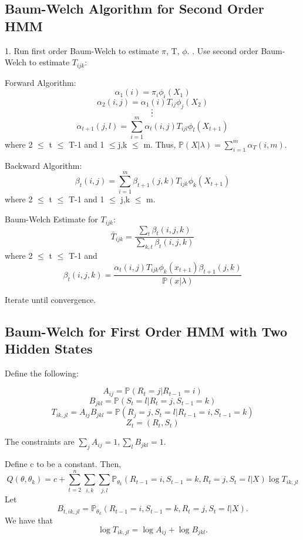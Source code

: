 \documentclass{article} %
\begin{document}
\subsection{Baum-Welch Algorithm for Second Order HMM}
\label{2ndHMM}
1. Run first order Baum-Welch to estimate $\pi$, T, $\phi$. . Use second order Baum-Welch to estimate $T_{ijk}$:\newline

Forward Algorithm: \newline
$$\alpha_1(i) = \pi_i \phi_i(X_1)$$
$$\alpha_2(i,j) = \alpha_1(i) T_{ij} \phi_j(X_2)$$
$$:$$
$$:$$
$$\alpha_{t+1}(j, l) = \sum_{i=1}^m \alpha_t(i,j) T_{ijl} \phi_l(X_{t+1})$$
where 2 $\leq$ t $\leq$ T-1 and 1 $\leq$j,k $\leq$  m. \newline
Thus, $\mathbb{P}(X | \lambda) = \sum_{i=1}^m \alpha_T(i,m)$. \newline

Backward Algorithm: \newline
$$\beta_t(i,j) = \sum_{i=1}^m \beta_{t+1}(j,k) T_{ijk} \phi_k(X_{t+1})$$
where 2 $\leq$ t $\leq$ T-1 and 1 $\leq$ j,k $\leq$ m. \newline

Baum-Welch Estimate for $T_{ijk}$: \newline
$$\bar{T}_{ijk} = \frac{\sum_t \beta_t (i,j,k)}{\sum_{k,t} \beta_t (i,j,k)}$$
where 2 $\leq$ t $\leq$ T-1 and \newline
$$\beta_t(i,j,k) = \frac{\alpha_t(i,j) T_{ijk} \phi_k(x_{t+1}) \beta_{t+1}(j,k)}{\mathbb{P}(x|\lambda)}$$ 




Iterate until convergence. 

\subsection{Baum-Welch for First Order HMM with Two Hidden States}
\label{3rdHMM}
Define the following:

$$A_{ij} = \mathbb{P} (R_t = j | R_{t-1} = i)$$
$$B_{jkl} = \mathbb{P} (S_t = l | R_t = j, S_{t-1} = k)$$ 
$$T_{ik, jl} = A_{ij} B_{jkl} = \mathbb{P} (R_j = j, S_t = l | R_{t-1} = i, S_{t-1} = k)$$
$$Z_t = (R_t, S_t)$$

The constraints are $\sum_j A_{ij} = 1, \sum_l B_{jkl} = 1.$ \newline

Define c to be a constant. Then,  \newline
$$Q(\theta, \theta_k) = c + \sum_{t=2}^n \sum_{i,k} \sum_{j,l} \mathbb{P}_{\theta_k} (R_{t-1} = i, S_{t-1} = k, R_t = j, S_t = l | X) \log T_{ik, jl}$$ 
Let $$B_{t,ik,jl} = \mathbb{P}_{\theta_k} (R_{t-1} = i, S_{t-1} = k, R_t = j, S_t = l | X).$$ We have that $$\log T_{ik, jl} = \log A_{ij} + \log B_{jkl}.$$
\end{document}
